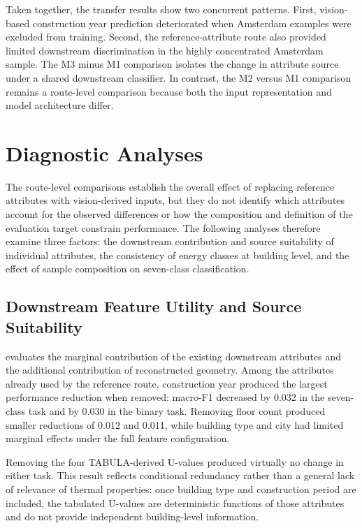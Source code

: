 Taken together, the transfer results show two concurrent patterns.
First, vision-based construction year prediction deteriorated when Amsterdam examples were excluded from training.
Second, the reference-attribute route also provided limited downstream discrimination in the highly concentrated Amsterdam sample.
The M3 minus M1 comparison isolates the change in attribute source under a shared downstream classifier.
In contrast, the M2 versus M1 comparison remains a route-level comparison because both the input representation and model architecture differ.

\section{Diagnostic Analyses}
\label{sec:diagnostic_analyses}

The route-level comparisons establish the overall effect of replacing reference attributes with vision-derived inputs, but they do not identify which attributes account for the observed differences or how the composition and definition of the evaluation target constrain performance.
The following analyses therefore examine three factors: the downstream contribution and source suitability of individual attributes, the consistency of energy classes at building level, and the effect of sample composition on seven-class classification.

\subsection{Downstream Feature Utility and Source Suitability}
\label{sec:feature_utility}

 evaluates the marginal contribution of the existing downstream attributes and the additional contribution of reconstructed geometry.
Among the attributes already used by the reference route, construction year produced the largest performance reduction when removed: macro-F1 decreased by 0.032 in the seven-class task and by 0.030 in the binary task.
Removing floor count produced smaller reductions of 0.012 and 0.011, while building type and city had limited marginal effects under the full feature configuration.

Removing the four TABULA-derived U-values produced virtually no change in either task.
This result reflects conditional redundancy rather than a general lack of relevance of thermal properties: once building type and construction period are included, the tabulated U-values are deterministic functions of those attributes and do not provide independent building-level information.

